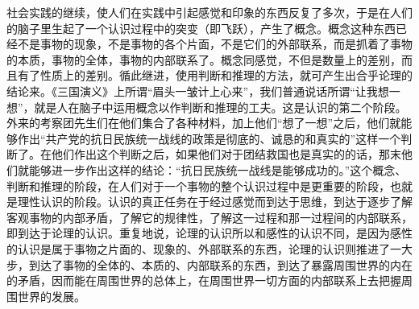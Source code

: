 \documentclass[UTF8, 12pt, a4paper]{ctexrep}
\begin{document}
社会实践的继续，使人们在实践中引起感觉和印象的东西反复了多次，于是在人们的脑子里生起了一个认识过程中的突变（即飞跃），产生了概念。概念这种东西已经不是事物的现象，不是事物的各个片面，不是它们的外部联系，而是抓着了事物的本质，事物的全体，事物的内部联系了。概念同感觉，不但是数量上的差别，而且有了性质上的差别。循此继进，使用判断和推理的方法，就可产生出合乎论理的结论来。《三国演义》上所谓“眉头一皱计上心来”，我们普通说话所谓“让我想一想”，就是人在脑子中运用概念以作判断和推理的工夫。这是认识的第二个阶段。外来的考察团先生们在他们集合了各种材料，加上他们“想了一想”之后，他们就能够作出“共产党的抗日民族统一战线的政策是彻底的、诚恳的和真实的”这样一个判断了。在他们作出这个判断之后，如果他们对于团结救国也是真实的的话，那末他们就能够进一步作出这样的结论：“抗日民族统一战线是能够成功的。”这个概念、判断和推理的阶段，在人们对于一个事物的整个认识过程中是更重要的阶段，也就是理性认识的阶段。认识的真正任务在于经过感觉而到达于思维，到达于逐步了解客观事物的内部矛盾，了解它的规律性，了解这一过程和那一过程间的内部联系，即到达于论理的认识。重复地说，论理的认识所以和感性的认识不同，是因为感性的认识是属于事物之片面的、现象的、外部联系的东西，论理的认识则推进了一大步，到达了事物的全体的、本质的、内部联系的东西，到达了暴露周围世界的内在的矛盾，因而能在周围世界的总体上，在周围世界一切方面的内部联系上去把握周围世界的发展。
\end{document}
